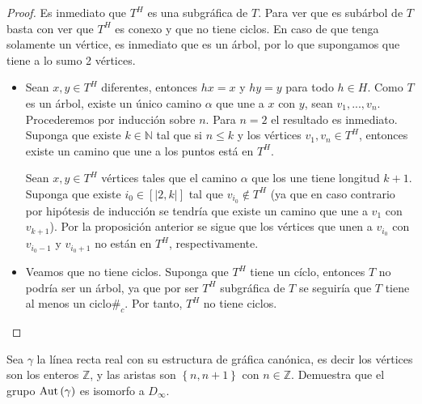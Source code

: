 \documentclass[12pt]{report}
\newcounter{it}
\theoremstyle{largebreak}
\newcommand\contradiction{\ensuremath{\#_c}}
\newcommand\natint[1]{\ensuremath{\left[\big|#1\big|\right]}}
\newcommand{\Aut}[1]{\ensuremath{\textup{Aut}\left(#1\right)}}
\begin{document}
    \begin{proof}
        Es inmediato que $T^H$ es una subgráfica de $T$. Para ver que es subárbol de $T$ basta con ver que $T^H$ es conexo y que no tiene ciclos. En caso de que tenga solamente un vértice, es inmediato que es un árbol, por lo que supongamos que tiene a lo sumo 2 vértices.
        \begin{itemize}
            \item Sean $x,y\in T^H$ diferentes, entonces $hx=x$ y $hy=y$ para todo $h\in H$. Como $T$ es un árbol, existe un único camino $\alpha$ que une a $x$ con $y$, sean $v_1,...,v_n$. Procederemos por inducción sobre $n$. Para $n=2$ el resultado es inmediato. Suponga que existe $k\in\mathbb{N}$ tal que si $n\leq k$ y los vértices $v_1,v_n\in T^H$, entonces existe un camino que une a los puntos está en $T^H$.
            
            Sean $x,y\in T^H$ vértices tales que el camino $\alpha$ que los une tiene longitud $k+1$. Suponga que existe $i_0\in\natint{2,k}$ tal que $v_{ i_0}\notin T^H$ (ya que en caso contrario por hipótesis de inducción se tendría que existe un camino que une a $v_1$ con $v_{k+1}$). Por la proposición anterior se sigue que los vértices que unen a $v_{i_0}$ con $v_{i_0-1}$ y $v_{i_0+1}$ no están en $T^H$, respectivamente.



            \item Veamos que no tiene ciclos. Suponga que $T^H$ tiene un cíclo, entonces $T$ no podría ser un árbol, ya que por ser $T^H$ subgráfica de $T$ se seguiría que $T$ tiene al menos un ciclo\contradiction. Por tanto, $T^H$ no tiene ciclos.
        \end{itemize}
    \end{proof}

    \begin{excer}
        Sea $\gamma$ la línea recta real con su estructura de gráfica canónica, es decir los vértices son los enteros $\mathbb{Z}$, y las aristas son $\left\{n,n+1\right\}$ con $n\in\mathbb{Z}$. Demuestra que el grupo $\Aut{\gamma}$ es isomorfo a $D_\infty$.
    \end{excer}
\end{document}
